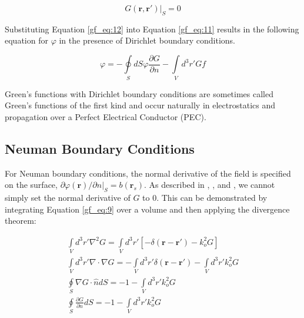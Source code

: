 \begin{equation}
G\left(\mathbf{r},\mathbf{r}' \right)\bigg|_{S}=0
\label{gf_eq:12}
\end{equation}
\renewcommand{\baselinestretch}{2} \small\normalsize

Substituting Equation \ref{gf_eq:12} into Equation \ref{gf_eq:11} results in the following equation for $\varphi$ in the presence of Dirichlet boundary conditions.

\begin{equation}
\boxed{\varphi = -\oint\limits_{S}dS \varphi\frac{\partial G}{\partial n} -\int\limits_{V}d^3r' Gf}
\label{gf_eq:13}
\end{equation}
\renewcommand{\baselinestretch}{2} \small\normalsize

Green's functions with Dirichlet boundary conditions are sometimes called Green's functions of the first kind and occur naturally in electrostatics and propagation over a Perfect Electrical Conductor (PEC). 

\subsection {Neuman Boundary Conditions}
For Neuman boundary conditions, the normal derivative of the field is specified on the surface, $\partial\varphi\left(\mathbf{r}\right)/\partial n|_{S} = b\left(\mathbf{r}_s\right)$. As described in \cite{jackson_classical_em}, \cite{zangwill_modern_em}, and \cite{balanis_advanced}, we cannot simply set the normal derivative of $G$ to $0$. This can be demonstrated by integrating Equation \ref{gf_eq:9} over a volume and then applying the divergence theorem:

\begin{equation}
\begin{gathered}
\int\limits_{V}d^3r' \nabla^2 G = \int\limits_{V}d^3r'\left[-\delta\left(\mathbf{r}-\mathbf{r}' \right) -k_o^2G \right] \\
\int\limits_{V}d^3r' \nabla \cdot \nabla G = -\int\limits_{V}d^3r'\delta\left(\mathbf{r}-\mathbf{r}' \right) -\int\limits_{V}d^3r'k_o^2G \\
\oint\limits_{S}\nabla G \cdot \hat{n} dS  = -1 - \int\limits_{V}d^3r'k_o^2G\\
\oint\limits_{S}\frac{\partial G}{\partial n} dS = -1 - \int\limits_{V}d^3r' k_o^2G
\end{gathered}
\label{gf_eq:14}
\end{equation}
\renewcommand{\baselinestretch}{2} \small\normalsize

